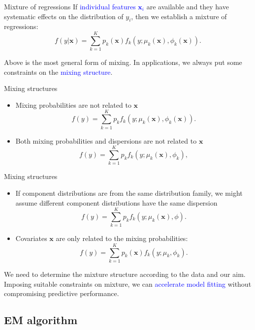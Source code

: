 \documentclass[professionalfont]{beamer}
\def\bx{\boldsymbol{x}}
\newcommand{\blue}[1]{\textcolor{blue}{#1}}
\begin{document}
 \begin{frame}{Mixture of regressions}
 	If \blue{individual features $\bx_i$} are available and they have systematic effects on the distribution of $y_i$, then we establish a mixture of regressions: 
 	$$f(y|\bx)=\sum_{k=1}^Kp_k(\bx)f_k(y;\mu_k(\bx),\phi_k(\bx)).$$
 	
 	Above is the most general form of mixing. 	In applications, we always put some constraints on the \blue{mixing structure}.
 \end{frame}
 
  \begin{frame}{Mixing structures}	
 
 	\begin{itemize}
 		\item Mixing probabilities are not related to $\bx$
 		$$f(y)=\sum_{k=1}^Kp_kf_k(y;\mu_k(\bx),\phi_k(\bx)).$$
 		\item Both mixing probabilities and dispersions are not related to $\bx$ 
 		 	$$f(y)=\sum_{k=1}^Kp_kf_k(y;\mu_k(\bx),\phi_k),$$
 		 	 	\end{itemize}
 	 	 \end{frame}
  	 	
  \begin{frame}{Mixing structures}
	
	\begin{itemize} 	 	 	
 		\item If component distributions are from the same distribution family, we might assume different component distributions have the same dispersion
 		 	$$f(y)=\sum_{k=1}^Kp_kf_k(y;\mu_k(\bx),\phi).$$
 		 \item Covariates $\bx$ are only related to the mixing probabilities:
 		  	$$f(y)=\sum_{k=1}^Kp_k(\bx)f_k(y;\mu_k,\phi_k).$$
 	\end{itemize}
 	 	
We need to determine the mixture structure according to the data and our aim. Imposing suitable constraints on mixture, we can \blue{accelerate model fitting} without compromising predictive performance. 
 
\end{frame}

\subsection{EM algorithm}
\end{document}
